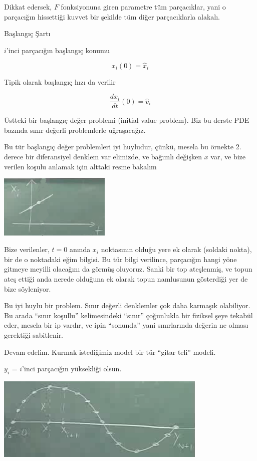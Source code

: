 \documentclass[12pt,fleqn]{article}\usepackage{../../common}
\begin{document}
Dikkat edersek, $F$ fonksiyonuna giren parametre tüm parçacıklar, yani o
parçacığın hissettiği kuvvet bir şekilde tüm diğer parçacıklarla alakalı. 

Başlangıç Şartı

$i$'inci parçacığın başlangıç konumu

$$ x_i(0) = \hat{x}_i $$

Tipik olarak başlangıç hızı da verilir

$$ \frac{dx_i}{dt}(0) = \hat{v}_i $$

Üstteki bir başlangıç değer problemi (initial value problem). Biz bu derste
PDE bazında sınır değerli problemlerle uğraşacağız. 

Bu tür başlangıç değer problemleri iyi huyludur, çünkü, mesela bu örnekte
2. derece bir diferansiyel denklem var elimizde, ve bağımlı değişken $x$
var, ve bize verilen koşulu anlamak için alttaki resme bakalım

\includegraphics[height=3cm]{1_06.png}

Bize verilenler, $t=0$ anında $x_i$ noktasının olduğu yere ek olarak
(soldaki nokta), bir de o noktadaki eğim bilgisi. Bu tür bilgi verilince,
parçacığın hangi yöne gitmeye meyilli olacağını da görmüş oluyoruz. Sanki
bir top ateşlenmiş, ve topun ateş ettiği anda nerede olduğuna ek olarak
topun namlusunun gösterdiği yer de bize söyleniyor.

Bu iyi huylu bir problem. Sınır değerli denklemler çok daha karmaşık
olabiliyor. Bu arada ``sınır koşullu'' kelimesindeki ``sınır'' çoğunlukla
bir fiziksel şeye tekabül eder, mesela bir ip vardır, ve ipin ``sonunda''
yani sınırlarında değerin ne olması gerektiği sabitlenir. 

Devam edelim. Kurmak istediğimiz model bir tür ``gitar teli'' modeli. 

$y_i$ = $i$'inci parçacığın yüksekliği olsun. 

\includegraphics[height=4cm]{1_07.png}
\end{document}
